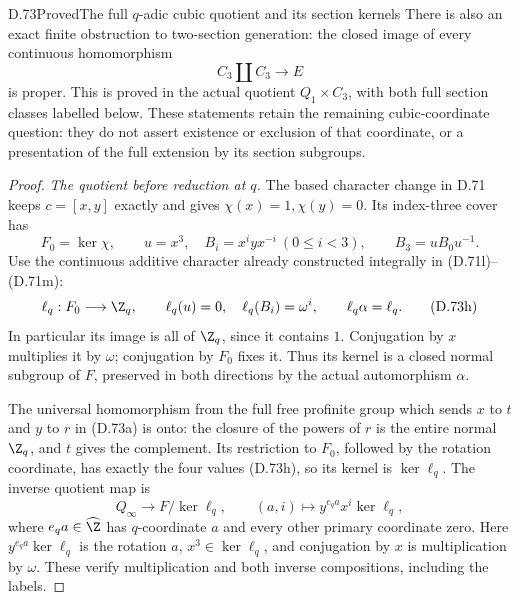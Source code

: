 \begin{claim}{D.73}{Proved}{The full \(q\)-adic cubic quotient and its section kernels}
There is also an exact finite obstruction to two-section generation:
the closed image of every continuous homomorphism
\[
                         C_3\amalg C_3\longrightarrow E
                                                               \tag{D.73f}
\]
is proper. This is proved in the actual quotient
\(Q_1\times C_3\), with both full section classes labelled below.
These statements retain the remaining cubic-coordinate question:
they do not assert existence or exclusion of that coordinate,
or a presentation of the full extension by its section subgroups.
\end{claim}
\begin{proof}
\emph{The quotient before reduction at \(q\).}
The based character change in D.71 keeps
\(c=[x,y]\) exactly and gives
\(\chi(x)=1,\chi(y)=0\). Its index-three cover has
\[
 F_0=\ker\chi,\qquad
 u=x^3,\quad B_i=x^iyx^{-i}\ (0\leq i<3),\qquad
 B_3=uB_0u^{-1}.
                                                               \tag{D.73g}
\]
Use the continuous additive character already constructed
integrally in (D.71l)--(D.71m):
\[
 \ell_q:F_0\longrightarrow\Z_q,\qquad
 \ell_q(u)=0,\quad\ell_q(B_i)=\omega^i,\qquad
                    \ell_q\alpha=\ell_q .
                                                               \tag{D.73h}
\]
In particular its image is all of \(\Z_q\), since it contains \(1\).
Conjugation by \(x\) multiplies it by \(\omega\);
conjugation by \(F_0\) fixes it. Thus its kernel is a
closed normal subgroup of \(F\), preserved in both directions
by the actual automorphism \(\alpha\).

The universal homomorphism from the full free profinite group
which sends \(x\) to \(t\) and \(y\) to \(r\) in (D.73a)
is onto: the closure of the powers of \(r\) is the entire
normal \(\Z_q\), and \(t\) gives the complement.
Its restriction to \(F_0\), followed by the rotation coordinate,
has exactly the four values (D.73h), so its kernel is
\(\ker\ell_q\). The inverse quotient map is
\[
 Q_\infty\longrightarrow F/\ker\ell_q,\qquad
 (a,i)\longmapsto y^{e_q a}x^i\ker\ell_q ,
                                                               \tag{D.73i}
\]
where \(e_q a\in\widehat\Z\) has \(q\)-coordinate \(a\)
and every other primary coordinate zero.
Here \(y^{e_q a}\ker\ell_q\) is the rotation \(a\),
\(x^3\in\ker\ell_q\), and conjugation by \(x\) is
multiplication by \(\omega\). These verify multiplication
and both inverse compositions, including the labels.


\end{proof}
